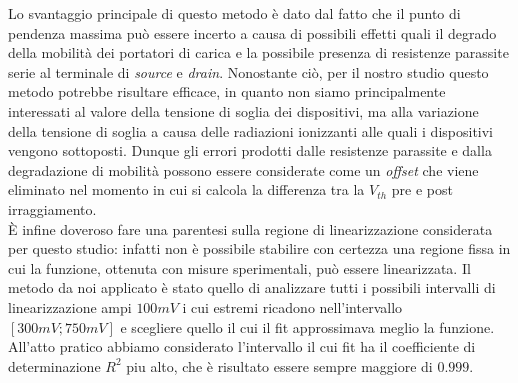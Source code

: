 Lo svantaggio principale di questo metodo è dato dal fatto che il punto di pendenza massima può essere incerto a causa di possibili effetti quali il degrado della mobilità dei portatori di carica e la possibile presenza di resistenze parassite serie al terminale di \emph{source} e \emph{drain}.
Nonostante ciò, per il nostro studio questo metodo potrebbe risultare efficace, in quanto non siamo principalmente interessati al valore della tensione di soglia dei dispositivi, ma alla variazione della tensione di soglia a causa delle radiazioni ionizzanti alle quali i dispositivi vengono sottoposti. Dunque gli errori prodotti dalle resistenze parassite e dalla degradazione di mobilità possono essere considerate come un \textit{offset} che viene eliminato nel momento in cui si calcola la differenza tra la $V_{th}$ pre e post irraggiamento.\\
È infine doveroso fare una parentesi sulla regione di linearizzazione considerata per questo studio: infatti non è possibile stabilire con certezza una regione fissa in cui la funzione, ottenuta con misure sperimentali, può essere linearizzata. Il metodo da noi applicato è stato quello di analizzare tutti i possibili intervalli di linearizzazione ampi $100 mV$ i cui estremi ricadono nell'intervallo $[300 mV ; 750mV]$ e scegliere quello il cui il fit approssimava meglio la funzione. All'atto pratico abbiamo considerato l'intervallo il cui fit ha il coefficiente di determinazione $R^2$ piu alto, che è risultato essere sempre maggiore di $0.999$.

\clearpage

